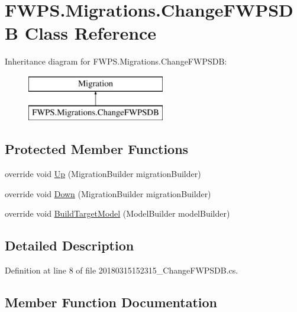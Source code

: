 \hypertarget{class_f_w_p_s_1_1_migrations_1_1_change_f_w_p_s_d_b}{}\section{F\+W\+P\+S.\+Migrations.\+Change\+F\+W\+P\+S\+DB Class Reference}
\label{class_f_w_p_s_1_1_migrations_1_1_change_f_w_p_s_d_b}
Inheritance diagram for F\+W\+P\+S.\+Migrations.\+Change\+F\+W\+P\+S\+DB\+:\begin{figure}[H]
\begin{center}
\leavevmode
\includegraphics[height=2.000000cm]{class_f_w_p_s_1_1_migrations_1_1_change_f_w_p_s_d_b}
\end{center}
\end{figure}
\subsection*{Protected Member Functions}
\begin{DoxyCompactItemize}
\item 
override void \mbox{\hyperlink{class_f_w_p_s_1_1_migrations_1_1_change_f_w_p_s_d_b_a55af5789cb4d9119801ccae1ec8adf37}{Up}} (Migration\+Builder migration\+Builder)
\item 
override void \mbox{\hyperlink{class_f_w_p_s_1_1_migrations_1_1_change_f_w_p_s_d_b_a00d0bd3428a326d8c9fa56abb39c5268}{Down}} (Migration\+Builder migration\+Builder)
\item 
override void \mbox{\hyperlink{class_f_w_p_s_1_1_migrations_1_1_change_f_w_p_s_d_b_a58175e214f4bd062e26ad2d362b6b421}{Build\+Target\+Model}} (Model\+Builder model\+Builder)
\end{DoxyCompactItemize}


\subsection{Detailed Description}


Definition at line 8 of file 20180315152315\+\_\+\+Change\+F\+W\+P\+S\+D\+B.\+cs.



\subsection{Member Function Documentation}
\mbox{\label{class_f_w_p_s_1_1_migrations_1_1_change_f_w_p_s_d_b_a58175e214f4bd062e26ad2d362b6b421}} 
